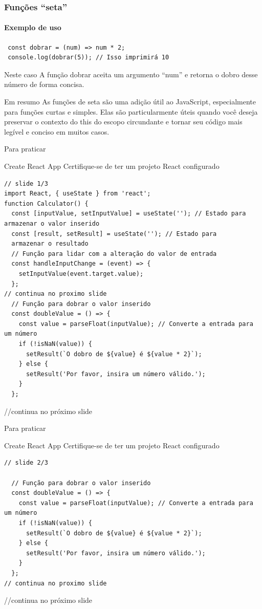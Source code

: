 \documentclass[13pt, xcolor={dvipsnames,svgnames}, portuguese]{beamer}
\begin{document}
\begin{frame}[fragile]
\frametitle{Funções ``seta''}
\framesubtitle{Exemplo de uso}

\begin{verbatim}
 const dobrar = (num) => num * 2;
 console.log(dobrar(5)); // Isso imprimirá 10
\end{verbatim}
\pause
\begin{exampleblock}{Neste caso}
 A função dobrar aceita um argumento ``num'' e retorna o dobro desse número de forma concisa.
\end{exampleblock}
\pause
\begin{block}{Em resumo}
As funções de seta são uma adição útil ao JavaScript, especialmente para funções curtas e simples. Elas são particularmente úteis quando você deseja preservar o contexto do this do escopo circundante e tornar seu código mais legível e conciso em muitos casos.

\end{block}
\end{frame}
\begin{frame}[fragile]{Para praticar}
\begin{exampleblock}{Create React App}
Certifique-se de ter um projeto React configurado
\end{exampleblock}
\begin{verbatim}
// slide 1/3
import React, { useState } from 'react';
function Calculator() {
  const [inputValue, setInputValue] = useState(''); // Estado para armazenar o valor inserido
  const [result, setResult] = useState(''); // Estado para
  armazenar o resultado
  // Função para lidar com a alteração do valor de entrada
  const handleInputChange = (event) => {
    setInputValue(event.target.value);
  };
// continua no proximo slide
  // Função para dobrar o valor inserido
  const doubleValue = () => {
    const value = parseFloat(inputValue); // Converte a entrada para um número
    if (!isNaN(value)) {
      setResult(`O dobro de ${value} é ${value * 2}`);
    } else {
      setResult('Por favor, insira um número válido.');
    }
  };

\end{verbatim}
//continua no próximo slide
\end{frame}




\begin{frame}[fragile]{Para praticar}
\begin{exampleblock}{Create React App}
Certifique-se de ter um projeto React configurado
\end{exampleblock}
\begin{verbatim}
// slide 2/3

  // Função para dobrar o valor inserido
  const doubleValue = () => {
    const value = parseFloat(inputValue); // Converte a entrada para um número
    if (!isNaN(value)) {
      setResult(`O dobro de ${value} é ${value * 2}`);
    } else {
      setResult('Por favor, insira um número válido.');
    }
  };
// continua no proximo slide
\end{verbatim}
//continua no próximo slide
\end{frame}
\end{document}
